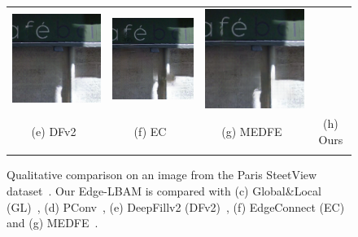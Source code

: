 \documentclass[10pt,journal,compsoc]{IEEEtran}
\begin{document}
\begin{figure}[hbt]
\begin{tabular}{cccc}
		\includegraphics[width=.234\textwidth]{paris/ec28-1}  &
		\includegraphics[width=.234\textwidth]{paris/MEDFE28-1}  &
		\includegraphics[width=.234\textwidth]{paris/ours28-1}  \\
		
		\scriptsize{(e) DFv2~\cite{yu2018free}} & \scriptsize{(f) EC~\cite{nazeri2019edgeconnect}} & \scriptsize{(g) MEDFE~\cite{liu2020rethinking}} & \scriptsize{(h) Ours} \\
		\vspace{-2mm}\\	
	\end{tabular}

	\caption{Qualitative comparison on an image from the Paris SteetView dataset~\cite{doersch2015makes}. Our Edge-LBAM is compared with (c) Global\&Local (GL)~\cite{IizukaGL}, (d) PConv~\cite{partialconv2017}, (e) DeepFillv2 (DFv2)~\cite{yu2018free}, (f) EdgeConnect (EC)~\cite{nazeri2019edgeconnect} and (g) MEDFE~\cite{liu2020rethinking}.}
	\label{fig:paris}
\end{figure}
\end{document}

